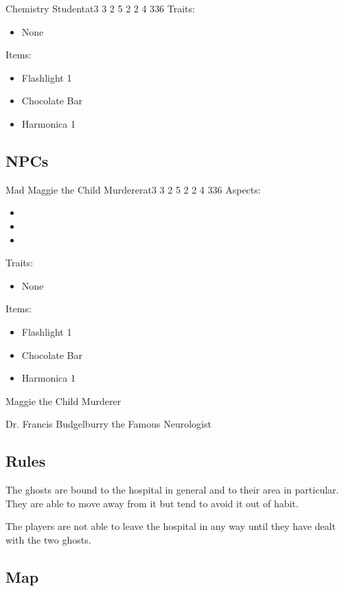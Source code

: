 \documentclass[11pt]{article}
\begin{document}
{\begin{npc}{Chemistry Student}{at}{3 3 2 5 2 2 4 3}{36}
Traits:
\begin{itemize}
\item None
\end{itemize}

Items:
\begin{itemize}
\item Flashlight 1
\item Chocolate Bar
\item Harmonica 1
\end{itemize}
\end{npc}
\subsection{NPCs}
\label{sec:org026b413}


\begin{npc}{Mad Maggie the Child Murderer}{at}{3 3 2 5 2 2 4 3}{36}
Aspects:
\begin{itemize}
\item {}
\item {}
\item {}
\end{itemize}
\columnbreak

Traits:
\begin{itemize}
\item None
\end{itemize}

Items:
\begin{itemize}
\item Flashlight 1
\item Chocolate Bar
\item Harmonica 1
\end{itemize}
\end{npc}

Maggie the Child Murderer

Dr. Francis Budgelburry the Famous Neurologist
\subsection{Rules}
\label{sec:org0652174}

The ghosts are bound to the hospital in general and to their area in particular. They are able to move away from it but tend to avoid it out of habit.

The players are not able to leave the hospital in any way until they have dealt with the two ghosts.
\subsection{Map}
\label{sec:org8e94d3d}

}
\end{document}
